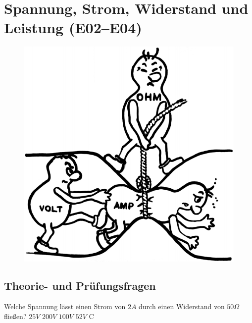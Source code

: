 \graphicspath{{e02-04_ET-Grundlagen/}}

\section{Spannung, Strom, Widerstand und Leistung (E02--E04)}

\begin{figure}
 \vspace{-7cm}
  \includegraphics[scale=0.15]{URI.png}
 \vspace{-6cm}
\end{figure}

\subsection{Theorie- und Prüfungsfragen}



{Welche Spannung lässt einen Strom von $2A$ durch einen Widerstand von
$50\Omega$ fließen?}%
{$25V$}%
{$200V$}%
{$100V$}%
{$52V$}%
{C}%

